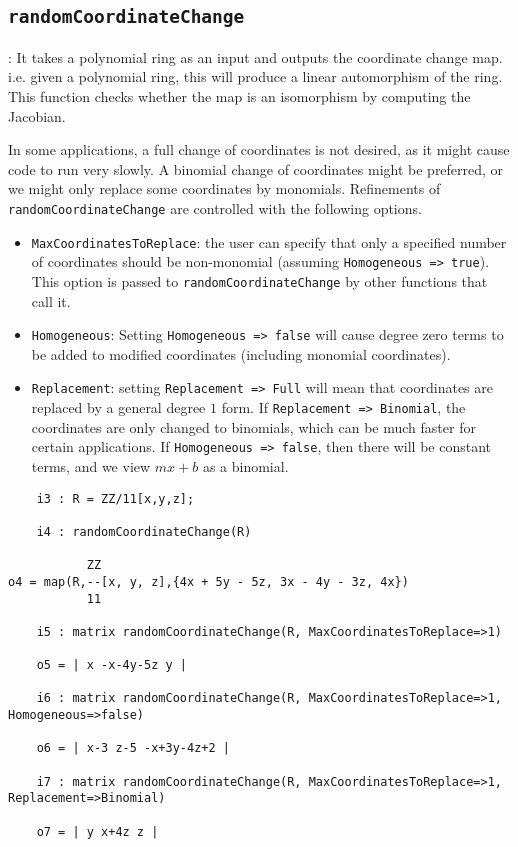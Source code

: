 \documentclass[11pt]{amsart}
\theoremstyle{definition}
\begin{document}
\subsection*{\tt randomCoordinateChange}: It takes a polynomial ring as an input and outputs the coordinate change map. 
	i.e. given a polynomial ring, this will produce a linear automorphism of the ring.  This function checks whether the map is an isomorphism by computing the Jacobian.
	
	In some applications, a full change of coordinates is not desired, as it might cause code to run very slowly.  A binomial change of coordinates might be preferred, or we might only replace some coordinates by monomials.  
	Refinements of {\tt randomCoordinateChange} are controlled with the following options.
	
	\begin{itemize}
		\item {\tt MaxCoordinatesToReplace}: the user can specify that only a specified number of coordinates should be non-monomial (assuming {\tt Homogeneous => true}).  
		This option is passed to {\tt randomCoordinateChange} by other functions that call it. 		
		\item {\tt Homogeneous}:  Setting {\tt Homogeneous => false} will cause degree zero terms to be added to modified coordinates (including monomial coordinates).
		\item {\tt Replacement}: setting {\tt Replacement => Full} will mean that coordinates are replaced by a general degree $1$ form.  If {\tt Replacement => Binomial}, the coordinates are only changed to binomials, which can be much faster for certain applications. If {\tt Homogeneous => false}, then there will be constant terms, and we view $mx + b$ as a binomial.
	\end{itemize} 

	{{\small\color{blue}
	\begin{verbatim}
	i3 : R = ZZ/11[x,y,z];

	i4 : randomCoordinateChange(R)

           ZZ
o4 = map(R,--[x, y, z],{4x + 5y - 5z, 3x - 4y - 3z, 4x})                     
           11

	i5 : matrix randomCoordinateChange(R, MaxCoordinatesToReplace=>1)

	o5 = | x -x-4y-5z y |

	i6 : matrix randomCoordinateChange(R, MaxCoordinatesToReplace=>1, Homogeneous=>false)

	o6 = | x-3 z-5 -x+3y-4z+2 |

	i7 : matrix randomCoordinateChange(R, MaxCoordinatesToReplace=>1, Replacement=>Binomial)

	o7 = | y x+4z z |
	\end{verbatim}}
	}
	  
\end{document}
